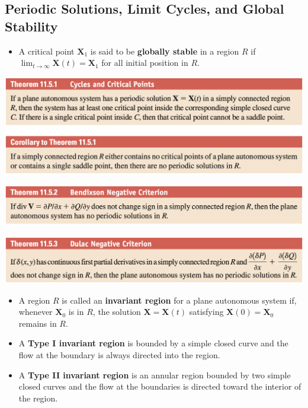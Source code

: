 \documentclass{article}
\begin{document}
\setcounter{subsection}{4}
\subsection{Periodic Solutions, Limit Cycles, and Global Stability}

\begin{itemize}
  \item A critical point $\mathbf{X}_1$ is said to be \textbf{globally stable} in a region $R$ if \\ $\lim_{t \rightarrow \infty} \mathbf{X}(t) = \mathbf{X}_1$ for all initial position in $R$.
\end{itemize}

\noindent
\includegraphics[scale=0.47]{cycles-and-critical-points}

\noindent
\includegraphics[scale=0.47]{bendixon-negative-criterion}

\noindent
\includegraphics[scale=0.47]{dulac-negative-criterion}

\begin{itemize}
\item A region $R$ is called an \textbf{invariant region} for a plane autonomous system if, whenever $\mathbf{X}_0$ is in $R$, the solution $\mathbf{X} = \mathbf{X}(t)$ satisfying $\mathbf{X}(0) = \mathbf{X}_0$ remains in $R$.

\item A \textbf{Type I invariant region} is bounded by a simple closed curve and the flow at the boundary is always directed into the region.

\item A \textbf{Type II invariant region} is an annular region bounded by two simple closed curves and the flow at the boundaries is directed toward the interior of the region.
\end{itemize}
\end{document}
